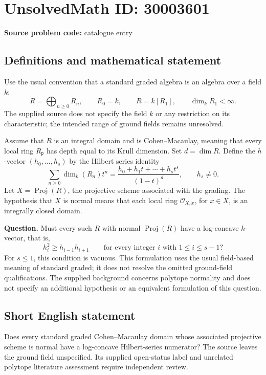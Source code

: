 \documentclass[11pt]{article}
\begin{document}
\section*{UnsolvedMath ID: 30003601}
\textbf{Source problem code:} catalogue entry
\subsection{Definitions and mathematical statement}
Use the usual convention that a standard graded algebra is an algebra over a field \(k\):
\[
R=\bigoplus_{n\geq 0}R_n,\qquad R_0=k,\qquad R=k[R_1],\qquad \dim_k R_1<\infty.
\]
The supplied source does not specify the field \(k\) or any restriction on its characteristic; the intended range of ground fields remains unresolved.

Assume that \(R\) is an integral domain and is Cohen--Macaulay, meaning that every local ring \(R_{\mathfrak p}\) has depth equal to its Krull dimension. Set \(d=\dim R\). Define the \(h\)-vector \((h_0,\ldots,h_s)\) by the Hilbert series identity
\[
\sum_{n\geq 0}\dim_k(R_n)t^n
=\frac{h_0+h_1t+\cdots+h_st^s}{(1-t)^d},
\qquad h_s\neq 0.
\]
Let \(X=\operatorname{Proj}(R)\), the projective scheme associated with the grading. The hypothesis that \(X\) is normal means that each local ring \(\mathcal O_{X,x}\), for \(x\in X\), is an integrally closed domain.

\textbf{Question.} Must every such \(R\) with normal \(\operatorname{Proj}(R)\) have a log-concave \(h\)-vector, that is,
\[
h_i^2\geq h_{i-1}h_{i+1}
\qquad\text{for every integer }i\text{ with }1\leq i\leq s-1?
\]
For \(s\leq 1\), this condition is vacuous. This formulation uses the usual field-based meaning of standard graded; it does not resolve the omitted ground-field qualifications. The supplied background concerns polytope normality and does not specify an additional hypothesis or an equivalent formulation of this question.
\subsection{Short English statement}
Does every standard graded Cohen--Macaulay domain whose associated projective scheme is normal have a log-concave Hilbert-series numerator? The source leaves the ground field unspecified. Its supplied open-status label and unrelated polytope literature assessment require independent review.
\end{document}

